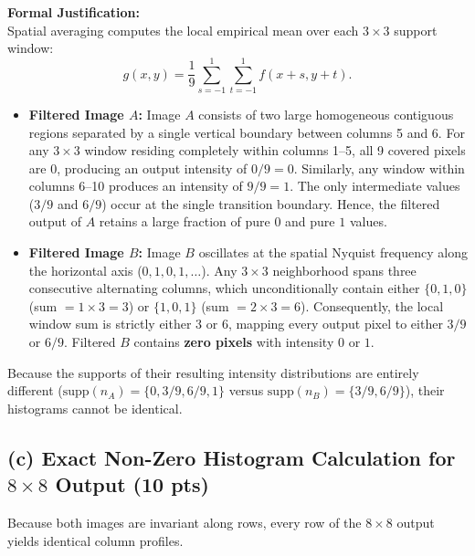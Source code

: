 \documentclass[11pt,a4paper]{article}
\begin{document}
\noindent\textbf{Formal Justification:}\\
Spatial averaging computes the local empirical mean over each $3 \times 3$ support window:
\begin{equation}
g(x, y) = \frac{1}{9} \sum_{s=-1}^1 \sum_{t=-1}^1 f(x+s, y+t).
\end{equation}
\begin{itemize}
    \item \textbf{Filtered Image $A$:} Image $A$ consists of two large homogeneous contiguous regions separated by a single vertical boundary between columns 5 and 6. For any $3 \times 3$ window residing completely within columns 1--5, all 9 covered pixels are $0$, producing an output intensity of $0/9 = 0$. Similarly, any window within columns 6--10 produces an intensity of $9/9 = 1$. The only intermediate values ($3/9$ and $6/9$) occur at the single transition boundary. Hence, the filtered output of $A$ retains a large fraction of pure $0$ and pure $1$ values.
    \item \textbf{Filtered Image $B$:} Image $B$ oscillates at the spatial Nyquist frequency along the horizontal axis ($0, 1, 0, 1, \dots$). Any $3 \times 3$ neighborhood spans three consecutive alternating columns, which unconditionally contain either $\{0, 1, 0\}$ (sum $= 1 \times 3 = 3$) or $\{1, 0, 1\}$ (sum $= 2 \times 3 = 6$). Consequently, the local window sum is strictly either $3$ or $6$, mapping every output pixel to either $3/9$ or $6/9$. Filtered $B$ contains \textbf{zero pixels} with intensity $0$ or $1$.
\end{itemize}
Because the supports of their resulting intensity distributions are entirely different ($\text{supp}(n_A) = \{0, 3/9, 6/9, 1\}$ versus $\text{supp}(n_B) = \{3/9, 6/9\}$), their histograms cannot be identical.

\subsection{(c) Exact Non-Zero Histogram Calculation for $8 \times 8$ Output (10 pts)}
Because both images are invariant along rows, every row of the $8 \times 8$ output yields identical column profiles.
\end{document}
